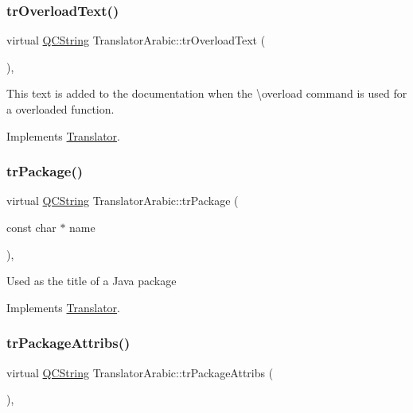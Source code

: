 \subsubsection{\texorpdfstring{trOverloadText()}{trOverloadText()}}
{\footnotesize\ttfamily virtual \mbox{\hyperlink{class_q_c_string}{Q\+C\+String}} Translator\+Arabic\+::tr\+Overload\+Text (\begin{DoxyParamCaption}{ }\end{DoxyParamCaption})\hspace{0.3cm}{\ttfamily [inline]}, {\ttfamily [virtual]}}

This text is added to the documentation when the \textbackslash{}overload command is used for a overloaded function. 

Implements \mbox{\hyperlink{class_translator}{Translator}}.

\mbox{\label{class_translator_arabic_a58878dd256679c4a9a9355d134e15f41}} 
\subsubsection{\texorpdfstring{trPackage()}{trPackage()}}
{\footnotesize\ttfamily virtual \mbox{\hyperlink{class_q_c_string}{Q\+C\+String}} Translator\+Arabic\+::tr\+Package (\begin{DoxyParamCaption}\item[{const char $\ast$}]{name }\end{DoxyParamCaption})\hspace{0.3cm}{\ttfamily [inline]}, {\ttfamily [virtual]}}

Used as the title of a Java package 

Implements \mbox{\hyperlink{class_translator}{Translator}}.

\mbox{\label{class_translator_arabic_a3fb7e1777720ff1ab10aaeee75dd2a2a}} 
\subsubsection{\texorpdfstring{trPackageAttribs()}{trPackageAttribs()}}
{\footnotesize\ttfamily virtual \mbox{\hyperlink{class_q_c_string}{Q\+C\+String}} Translator\+Arabic\+::tr\+Package\+Attribs (\begin{DoxyParamCaption}{ }\end{DoxyParamCaption})\hspace{0.3cm}{\ttfamily [inline]}, {\ttfamily [virtual]}}

